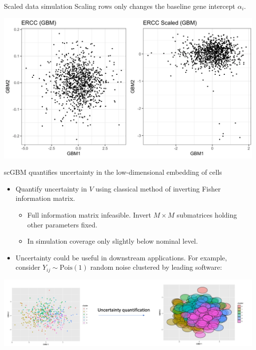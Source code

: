 \documentclass[aspectratio=43]{beamer}
\begin{document}
\begin{frame}{Scaled data simulation}
Scaling rows only changes the baseline gene intercept $\alpha_i$.

\vspace{1em}

\centering 
\includegraphics[scale=0.15]{Fig/ercc_scaled_gbm.png}
\end{frame}

\begin{frame}{scGBM quantifies uncertainty in the low-dimensional embedding of cells}
\begin{itemize}
\item Quantify uncertainty in $V$ using classical method of inverting Fisher information matrix. 
\begin{itemize}
\item Full information matrix infeasible. Invert $M \times M$ submatrices holding other parameters fixed.
\item In simulation coverage only slightly below nominal level. 
\end{itemize}

\item Uncertainty could be useful in downstream applications. For example, consider $Y_{ij} \sim \text{Pois}(1)$ random noise clustered by leading software: 
\end{itemize}

\centering
\includegraphics[scale=0.14]{Fig/null_cluster_uncertainty.png}
\end{frame}
\end{document}
